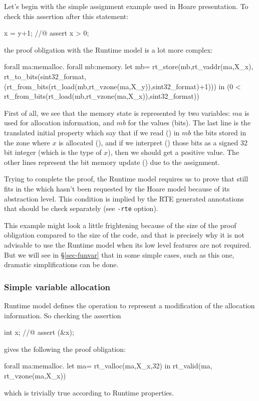 Let's begin with the simple assignment example used in Hoare presentation.
To check this assertion after this statement:
\begin{ccode}
  x = y+1;
  //@ assert x > 0;
\end{ccode}
the proof obligation with the Runtime model is a lot more complex:
\begin{whycode}
  forall ma:memalloc.
  forall mb:memory.
  let mb=
    rt_store(mb,rt_vaddr(ma,X_x),
      rt_to_bits(sint32_format,
        (rt_from_bits(rt_load(mb,rt_vzone(ma,X_y)),sint32_format)+1))) in
  (0 < rt_from_bits(rt_load(mb,rt_vzone(ma,X_x)),sint32_format))
\end{whycode}
First of all, we see that the memory state is represented by two variables:
$ma$ is used for allocation information, and $mb$ for the values (bits).
The last line is the translated initial property which say that if we read
() in $mb$ the bits stored in the zone where $x$ is allocated
(), and if we interpret ()
those bits as a signed 32 bit integer (which is the type of $x$),
then we should get a positive value.
The other lines represent the bit memory update ()
due to the assignment.

Trying to complete the proof, the Runtime model requires us to prove
that  still fits in the  which hasn't
been requested by the Hoare model because of its abstraction level.
This condition is implied by the RTE generated annotations
that should be check separately (see \verb!-rte! option).

This example might look a little frightening because of the size of the proof
obligation compared to the size of the code, and that is precisely why 
it is not advisable to use the Runtime model when its low level features are not
required. But we will see in \S\ref{sec-funvar} that in some simple cases,
such as this one, dramatic simplifications can be done.


\subsubsection{Simple variable allocation}

Runtime model defines the operation  to represent
a modification of the allocation information. So checking the assertion
\begin{ccode}
  int x;
  //@ assert \valid (&x);
\end{ccode}
gives the following the proof obligation:
\begin{whycode}
  forall ma:memalloc.
  let ma= rt_valloc(ma,X_x,32) in
  rt_valid(ma, rt_vzone(ma,X_x))
\end{whycode}
which is trivially true according to Runtime properties.

